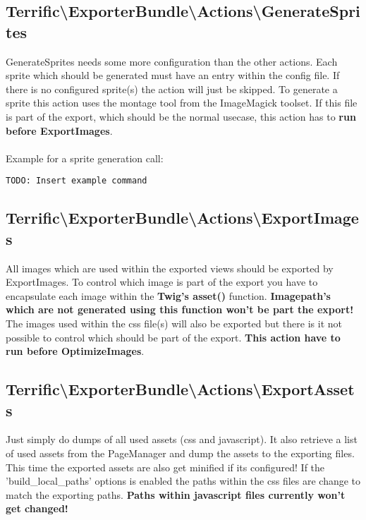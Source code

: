 \subsection{Terrific\textnormal{\textbackslash}ExporterBundle\textnormal{\textbackslash}Actions\textnormal{\textbackslash}GenerateSprites}
GenerateSprites needs some more configuration than the other actions. Each sprite which should be generated must have an entry within the config file. If there is no configured sprite(s) the action will just be skipped. To generate a sprite this action uses the montage tool from the ImageMagick toolset. If this file is part of the export, which should be the normal usecase, this action has to \textbf{run before ExportImages}.\\
\\
Example for a sprite generation call:
\begin{verbatim}
TODO: Insert example command
\end{verbatim}

\subsection{Terrific\textnormal{\textbackslash}ExporterBundle\textnormal{\textbackslash}Actions\textnormal{\textbackslash}ExportImages}
All images which are used within the exported views should be exported by ExportImages. To control which image is part of the export you have to encapsulate each image within the \textbf{Twig's asset()} function. \textbf{Imagepath's which are not generated using this function won't be part the export!} The images used within the css file(s) will also be exported but there is it not possible to control which should be part of the export. \textbf{This action have to run before OptimizeImages}.

\subsection{Terrific\textnormal{\textbackslash}ExporterBundle\textnormal{\textbackslash}Actions\textnormal{\textbackslash}ExportAssets}
Just simply do dumps of all used assets (css and javascript). It also retrieve a list of used assets from the PageManager and dump the assets to the exporting files. This time the exported assets are also get minified if its configured! If the 'build\_local\_paths' options is enabled the paths within the css files are change to match the exporting paths. \textbf{Paths within javascript files currently won't get changed!}

